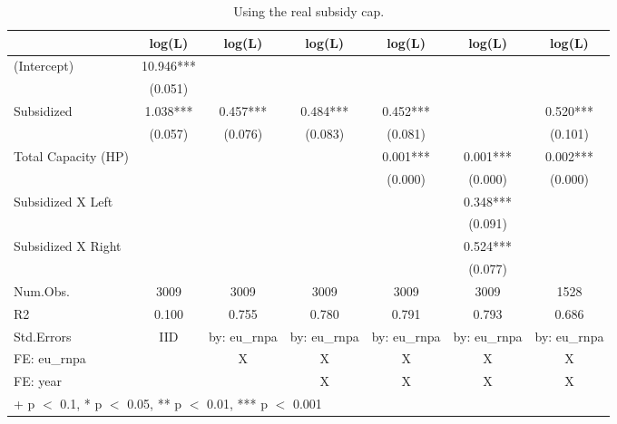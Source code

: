 \begin{table}

\caption{\label{tab:}Using the real subsidy cap.}
\centering
\begin{tabular}[t]{lcccccc}
\toprule
  & log(L) & log(L)  & log(L)   & log(L)    & log(L)     & log(L)     \\
\midrule
(Intercept) & \num{10.946}*** &  &  &  &  & \\
 & (\num{0.051}) &  &  &  &  & \\
Subsidized & \num{1.038}*** & \num{0.457}*** & \num{0.484}*** & \num{0.452}*** &  & \num{0.520}***\\
 & (\num{0.057}) & (\num{0.076}) & (\num{0.083}) & (\num{0.081}) &  & (\num{0.101})\\
Total Capacity (HP) &  &  &  & \num{0.001}*** & \num{0.001}*** & \num{0.002}***\\
 &  &  &  & (\num{0.000}) & (\num{0.000}) & (\num{0.000})\\
Subsidized X Left &  &  &  &  & \num{0.348}*** & \\
 &  &  &  &  & (\num{0.091}) & \\
Subsidized X Right &  &  &  &  & \num{0.524}*** & \\
 &  &  &  &  & (\num{0.077}) & \\
\midrule
Num.Obs. & \num{3009} & \num{3009} & \num{3009} & \num{3009} & \num{3009} & \num{1528}\\
R2 & \num{0.100} & \num{0.755} & \num{0.780} & \num{0.791} & \num{0.793} & \num{0.686}\\
Std.Errors & IID & by: eu\_rnpa & by: eu\_rnpa & by: eu\_rnpa & by: eu\_rnpa & by: eu\_rnpa\\
FE: eu_rnpa &  & X & X & X & X & X\\
FE: year &  &  & X & X & X & X\\
\bottomrule
\multicolumn{7}{l}{\rule{0pt}{1em}+ p $<$ 0.1, * p $<$ 0.05, ** p $<$ 0.01, *** p $<$ 0.001}\\
\end{tabular}
\end{table}
